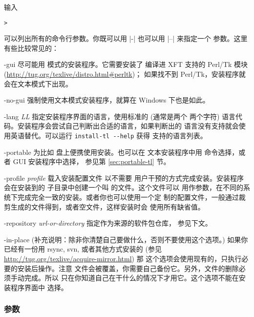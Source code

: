 \documentclass{article}
\begin{document}
输入
\begin{alltt}
> 
\end{alltt}
可以列出所有的命令行参数。你既可以用 |-| 也可以用 |--| 来指定一个
参数。这里有些比较常见的：

\begin{ttdescription}
\item[-gui] 尽可能用 \GUI{} 模式的安装程序。它需要安装了
  编译进 XFT 支持的 Perl/Tk 模块
  (\url{http://tug.org/texlive/distro.html#perltk})；
  如果找不到 Perl/Tk，安装程序就会在文本模式下出现。

\item[-no-gui] 强制使用文本模式安装程序，就算在 Windows 下也是如此。

\item[-lang {\sl LL}] 指定安装程序界面的语言，使用标准的 (通常是两个
两个字符) 语言代码。安装程序会尝试自己判断出合适的语言，如果判断出的
语言没有支持就会使用英语替代。可以运行 \verb|install-tl --help| 获得
支持的语言列表。

\item[-portable] 为比如 \USB{} 盘上便携使用安装。也可以在
文本安装程序中用  命令选择，或者 GUI 安装程序中选择，
参见第 \ref{sec:portable-tl} 节。

\item[-profile {\sl profile}] 载入安装配置文件  以不需要
用户干预的方式完成安装。安装程序会在安装到的 
子目录中创建一个叫  的文件。这个文件可以
用作参数，在不同的系统下完成完全一致的安装。或者你也可以使用一个定
制的配置文件，一般通过裁剪生成的文件得到，或者空文件，这样安装时会
使用所有缺省值。

\item [-repository {\sl url-or-directory}] 指定作为来源的软件包仓库，
参见下文。

\item[-in-place] (补充说明：除非你清楚自己要做什么，否则不要使用这个选项。)
如果你已经有一份用 rsync, svn, 或者其他方式安装的
\TL{} (参见 \url{http://tug.org/texlive/acquire-mirror.html}) 那
这个选项会使用现有的，只执行必要的安装后操作。注意 
文件会被覆盖，你需要自己备份它。另外，文件的删除必须手动完成。所以
只在你知道自己在干什么的情况下才用它。这个选项不能在安装程序界面中
选择。

\end{ttdescription}

\subsubsection{ 参数}
\label{sec:location}
\end{document}

